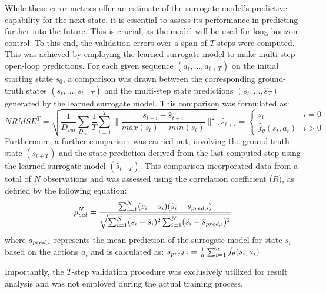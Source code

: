 While these error metrics offer an estimate of the surrogate model's predictive capability for the next state, it is essential to assess its performance in predicting further into the future. This is crucial, as the model will be used for long-horizon control. To this end, the validation errors over a span of $T$ steps were computed. This was achieved by employing the learned surrogate model to make multi-step open-loop predictions. For each given sequence $(a_t, ..., a_{t+T})$ on the initial starting state $s_0$, a comparison was drawn between the corresponding ground-truth states $(s_t, ..., s_{t+T})$ and the multi-step state predictions $(\hat{s}_t, ..., \hat{s}_T)$ generated by the learned surrogate model. This comparison was formulated as:
\begin{equation}
    NRMSE^{T} = \sqrt{\frac{1}{D_{val}}\sum_{D_{val}}\frac{1}{T}\sum_{i=1}^{T}\lVert \frac{s_{t+i}-\hat{s}_{t+i}}{max(s_t) - min(s_t)}\rVert^2}, 
    \hat{s}_{t+i} = \begin{cases} 
                        s_t & i=0 \\
                        \hat{f}_\theta(s_t, a_t) & i>0
                    \end{cases}
    \label{eq:NRMSET}
\end{equation}
Furthermore, a further comparison was carried out, involving the ground-truth state $(s_{t+T})$ and the state prediction derived from the last computed step using the learned surrogate model $(\hat{s}_{t+T})$.  This comparison incorporated data from a total of $N$ observations and was assessed using the correlation coefficient ($R$), as defined by the following equation:
\begin{equation}
    \rho_{val}^{N} = \frac{\sum_{i=1}^{N}(s_i - \Bar{s}_i)(\hat{s}_i-\Bar{s}_{pred,i})}{\sqrt{\sum_{i=1}^{N}(s_i - \Bar{s}_i)^2 \sum_{i=1}^{N}(\hat{s}_i-\Bar{s}_{pred,i})^2}}
    \label{eq:R}
\end{equation}
where $\Bar{s}_{pred,i}$ represents the mean prediction of the surrogate model for state $s_i$ based on the actions $a_i$ and is calculated as: $\Bar{s}_{pred,i} = \frac{1}{n}\sum_{i=1}^{n}\hat{f}_\theta(s_i, a_i)$ 

Importantly, the $T$-step validation procedure was exclusively utilized for result analysis and was not employed during the actual training process.

